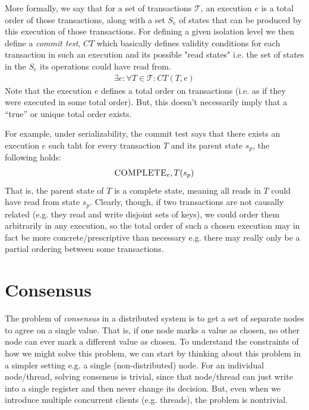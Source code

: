 \documentclass[10pt,a4paper]{article}
\begin{document}
More formally, we say that for a set of transactions $\mathcal{T}$, an execution $e$ is a total order of those transactions, along with a set $S_e$ of states that can be produced by this execution of those transactions. For defining a given isolation level we then define a \textit{commit test}, $CT$ which basically defines validity conditions for each transaction in such an execution and its possible "read states" i.e. the set of states in the $S_e$ its operations could have read from. 
\begin{align*}
    \exists e : \forall T \in \mathcal{T} : CT(T,e)
\end{align*}
Note that the execution $e$ defines a total order on transactions (i.e. as if they were executed in some total order). But, this doesn't necessarily imply that a ``true'' or unique total order exists. 

For example, under serializability, the commit test says that there exists an execution $e$ such taht for every transaction $T$ and its parent state $s_p$, the following holds: 
\begin{align*}
\textsc{COMPLETE}_e,T (s_p)
\end{align*}
That is, the parent state of $T$ is a complete state, meaning all reads in $T$ could have read from state $s_p$. Clearly, though, if two transactions are not causally related (e.g. they read and write disjoint sets of keys), we could order them arbitrarily in any execution, so the total order of such a chosen execution may in fact be more concrete/prescriptive than necessary e.g. there may really only be a partial ordering between some transactions.



\section{Consensus}

The problem of \textit{consensus} in a distributed system is to get a set of separate nodes to agree on a single value. That is, if one node marks a value as chosen, no other node can ever mark a different value as chosen. To understand the constraints of how we might solve this problem, we can start by thinking about this problem in a simpler setting e.g. a single (non-distributed) node. For an individual node/thread, solving consensus is trivial, since that node/thread can just write into a single register and then never change its decision. But, even when we introduce multiple concurrent clients (e.g. threads), the problem is nontrivial. 
\end{document}
